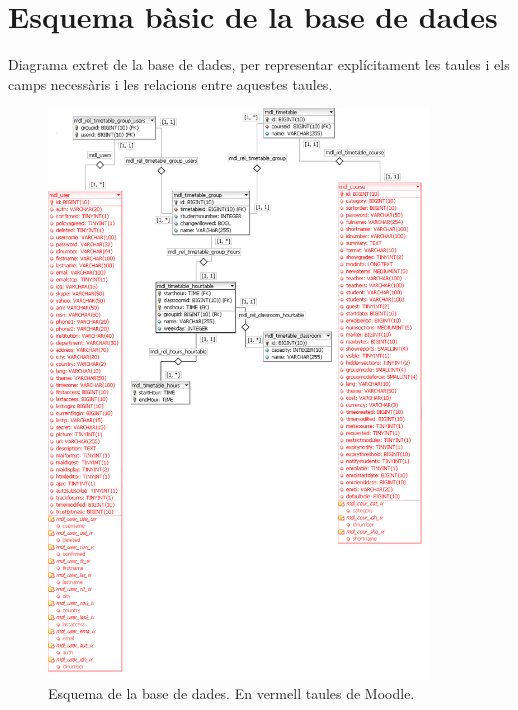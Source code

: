 \documentclass[a4paper]{report}  %
\begin{document}
\section{Esquema bàsic de la base de dades}
Diagrama extret de la base de dades, per representar explícitament les taules i els camps necessàris i les relacions entre aquestes taules.
		\begin{figure}[H] %
		\begin{center}
		\includegraphics[width=0.90\textwidth,keepaspectratio]{img/DiagramaBBDD-1r.png}
		\caption[List caption]{Esquema de la base de dades. En vermell taules de Moodle.}
		\label{fig:DiagramaBBDD-1r}
		\end{center}
		\end{figure}
\end{document}
